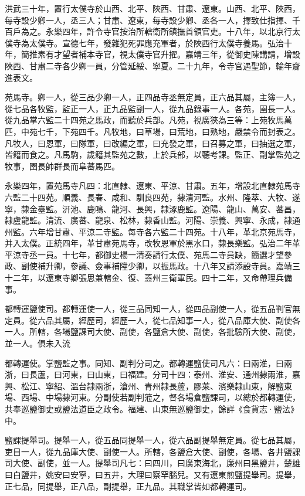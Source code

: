 洪武三十年，置行太僕寺於山西、北平、陜西、甘肅、遼東。山西、北平、陜西，每寺設少卿一人，丞三人；甘肅、遼東，每寺設少卿、丞各一人，擇致仕指揮、千百戶為之。永樂四年，許令寺官按治所轄衛所鎮撫首領官吏。十八年，以北京行太僕寺為太僕寺。宣德七年，發雜犯死罪應充軍者，於陜西行太僕寺養馬。弘治十年，簡推素有才望者補本寺官，視太僕寺官升擢。嘉靖三年，從御史陳講請，增設陜西、甘肅二寺各少卿一員，分管延綏、寧夏。二十九年，令寺官遇聖節，輪年齎進表文。

苑馬寺。卿一人，從三品少卿一人，正四品寺丞無定員，正六品其屬，主簿一人，從七品各牧監，監正一人，正九品監副一人，從九品錄事一人。各苑，圉長一人。從九品掌六監二十四苑之馬政，而聽於兵部。凡苑，視廣狹為三等：上苑牧馬萬匹，中苑七千，下苑四千。凡牧地，曰草場，曰荒地，曰熟地，嚴禁令而封表之。凡牧人，曰恩軍，曰隊軍，曰改編之軍，曰充發之軍，曰召募之軍，曰抽選之軍，皆籍而食之。凡馬駒，歲籍其監苑之數，上於兵部，以聽考課。監正、副掌監苑之牧事，圉長帥群長而阜蕃馬匹。

永樂四年，置苑馬寺凡四：北直隸、遼東、平涼、甘肅。五年，增設北直隸苑馬寺六監二十四苑。順義、長春、咸和、馴良四苑，隸清河監。水州、隆萃、大牧、遂寧，隸金臺監。汧池、鹿鳴、龍河、長興，隸涿鹿監。遼陽、龍山、萬安、蕃昌，隸盧龍監。清流、廣蕃、龍泉、松林，隸香山監。河陽、崇義、興寧、永成，隸通州監。六年增甘肅、平涼二寺監。每寺各六監二十四苑。十八年，革北京苑馬寺，并入太僕。正統四年，革甘肅苑馬寺，改牧恩軍於黑水口，隸長樂監。弘治二年革平涼寺丞一員。十七年，都御史楊一清奏請行太僕、苑馬二寺員缺，簡選才望參政、副使補升卿，參議、僉事補陞少卿，以振馬政。十八年又請添設寺員。嘉靖三十二年，以遼東寺卿張思兼轄金、復、蓋州三衛軍民。四十二年，又命帶理兵備事。

都轉運鹽使司。都轉運使一人，從三品同知一人，從四品副使一人，從五品判官無定員。從六品其屬，經歷司，經歷一人，從七品知事一人，從八品庫大使、副使各一人。所轄，各場鹽課司大使、副使，各鹽倉大使、副使，各批驗所大使、副使，並一人。俱未入流

都轉運使。掌鹽監之事。同知、副判分司之。都轉運鹽使司凡六：曰兩淮，曰兩浙，曰長蘆，曰河東，曰山東，曰福建。分司十四：泰州、淮安、通州隸兩淮，嘉興、松江、寧紹、溫台隸兩浙，滄州、青州隸長蘆，膠萊、濱樂隸山東，解鹽東場、西場、中場隸河東。分副使若副判蒞之，督各場倉鹽課司，以總於都轉運使，共奉巡鹽御史或鹽法道臣之政令。福建、山東無巡鹽御史，餘詳《食貨志·鹽法》中。

鹽課提舉司。提舉一人，從五品同提舉一人，從六品副提舉無定員。從七品其屬，吏目一人，從九品庫大使、副使一人。所轄，各鹽倉大使、副使，各場、各井鹽課司大使、副使，並一人。提舉司凡七：曰四川，曰廣東海北，廉州曰黑鹽井，楚雄曰白鹽井，姚安曰安寧，曰五井，大理曰察罕腦兒。又有遼東煎鹽提舉司。提舉，正七品，同提舉，正八品，副提舉，正九品。其職掌皆如都轉運司。


